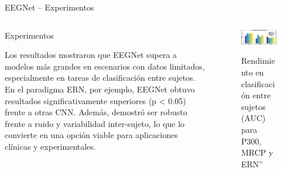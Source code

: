 \documentclass{beamer}
\begin{document}
\begin{frame}{EEGNet – Experimentos}
\begin{columns}[T] %
    \begin{column}{0.50\textwidth}
\begin{block}{Experimentos}

Los resultados mostraron que EEGNet supera a modelos más grandes en escenarios con datos limitados, especialmente en tareas de clasificación entre sujetos. En el paradigma ERN, por ejemplo, EEGNet obtuvo resultados significativamente superiores (p < 0.05) frente a otras CNN. Además, demostró ser robusto frente a ruido y variabilidad inter-sujeto, lo que lo convierte en una opción viable para aplicaciones clínicas y experimentales.
        \end{block}
    \end{column}

    \begin{column}{0.5\textwidth}
        \begin{figure}
            \centering
            \href{https://ar5iv.labs.arxiv.org/html/1611.08024}{%
            \includegraphics[width=\linewidth]{EEGNet.png}%
            }
            \caption{\small Rendimiento en clasificación entre sujetos (AUC) para P300, MRCP y ERN”}
            \label{fig:flujo_eeg}
        \end{figure}
    \end{column}
\end{columns}
\end{frame}
\end{document}

